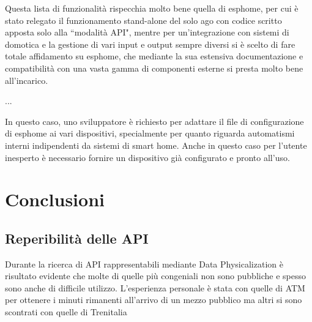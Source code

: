 \documentclass[12pt,a4paper]{report}
\begin{document}
Questa lista di funzionalità rispecchia molto bene quella di esphome, per cui è stato relegato il funzionamento stand-alone del solo ago
con codice scritto apposta solo alla ``modalità API", mentre per un'integrazione con sistemi di domotica e la gestione di vari input e output
sempre diversi si è scelto di fare totale affidamento su esphome, che mediante la sua estensiva documentazione e compatibilità con una vasta
gamma di componenti esterne si presta molto bene all'incarico.

...

In questo caso, uno sviluppatore è richiesto per adattare il file di configurazione di esphome ai vari dispositivi, specialmente per quanto riguarda
automatismi interni indipendenti da sistemi di smart home. Anche in questo caso per l'utente inesperto è necessario fornire un dispositivo già
configurato e pronto all'uso.

\chapter{Conclusioni}



\section{Reperibilità delle API}
Durante la ricerca di API rappresentabili mediante Data Physicalization è risultato evidente che molte di quelle più congeniali non
sono pubbliche e spesso sono anche di difficile utilizzo. L'esperienza personale è stata con quelle di ATM per ottenere i minuti rimanenti
all'arrivo di un mezzo pubblico ma altri si sono scontrati con quelle di Trenitalia \cite{trenitaliashock}
\end{document}
